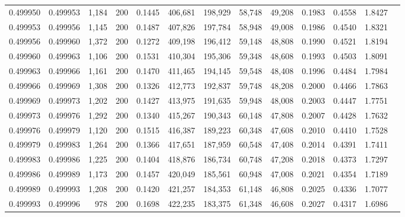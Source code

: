 \begin{tabular}{rrrrrrrrrrrrr}
0.499950 & 0.499953 & 1,184 & 200 &                                     0.1445 & 406,681 & 198,929 &  58,748 &  49,208 & 0.1983 & 0.4558 & 1.8427 \\
0.499953 & 0.499956 & 1,145 & 200 &                                     0.1487 & 407,826 & 197,784 &  58,948 &  49,008 & 0.1986 & 0.4540 & 1.8321 \\
0.499956 & 0.499960 & 1,372 & 200 &                                     0.1272 & 409,198 & 196,412 &  59,148 &  48,808 & 0.1990 & 0.4521 & 1.8194 \\
0.499960 & 0.499963 & 1,106 & 200 &                                     0.1531 & 410,304 & 195,306 &  59,348 &  48,608 & 0.1993 & 0.4503 & 1.8091 \\
0.499963 & 0.499966 & 1,161 & 200 &                                     0.1470 & 411,465 & 194,145 &  59,548 &  48,408 & 0.1996 & 0.4484 & 1.7984 \\
0.499966 & 0.499969 & 1,308 & 200 &                                     0.1326 & 412,773 & 192,837 &  59,748 &  48,208 & 0.2000 & 0.4466 & 1.7863 \\
0.499969 & 0.499973 & 1,202 & 200 &                                     0.1427 & 413,975 & 191,635 &  59,948 &  48,008 & 0.2003 & 0.4447 & 1.7751 \\
0.499973 & 0.499976 & 1,292 & 200 &                                     0.1340 & 415,267 & 190,343 &  60,148 &  47,808 & 0.2007 & 0.4428 & 1.7632 \\
0.499976 & 0.499979 & 1,120 & 200 &                                     0.1515 & 416,387 & 189,223 &  60,348 &  47,608 & 0.2010 & 0.4410 & 1.7528 \\
0.499979 & 0.499983 & 1,264 & 200 &                                     0.1366 & 417,651 & 187,959 &  60,548 &  47,408 & 0.2014 & 0.4391 & 1.7411 \\
0.499983 & 0.499986 & 1,225 & 200 &                                     0.1404 & 418,876 & 186,734 &  60,748 &  47,208 & 0.2018 & 0.4373 & 1.7297 \\
0.499986 & 0.499989 & 1,173 & 200 &                                     0.1457 & 420,049 & 185,561 &  60,948 &  47,008 & 0.2021 & 0.4354 & 1.7189 \\
0.499989 & 0.499993 & 1,208 & 200 &                                     0.1420 & 421,257 & 184,353 &  61,148 &  46,808 & 0.2025 & 0.4336 & 1.7077 \\
0.499993 & 0.499996 &   978 & 200 &                                     0.1698 & 422,235 & 183,375 &  61,348 &  46,608 & 0.2027 & 0.4317 & 1.6986 \\

\end{tabular}
